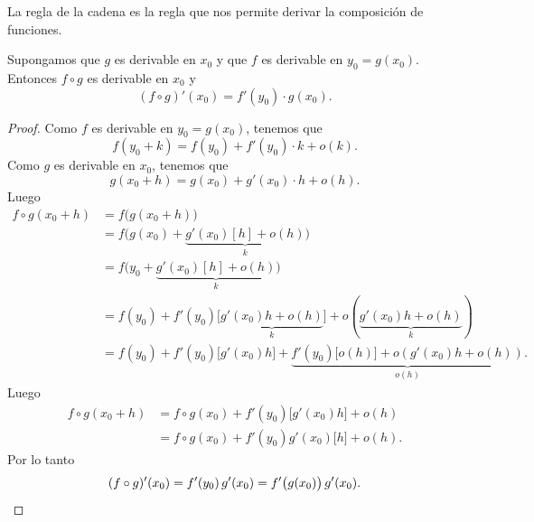 La regla de la cadena es la regla que nos permite derivar la composición de funciones.

\begin{proposition}
Supongamos que $g$ es derivable en $x_0$ y que $f$ es derivable en $y_0 = g(x_0)$.
Entonces $f\circ g$ es derivable en $x_0$ y
\[
(f\circ g)'(x_0) = f'(y_0) \cdot g(x_0).
\]
\end{proposition}

\begin{proof}
Como $f$ es derivable en $y_0 = g(x_0)$, tenemos que
\[
f(y_0+k) = f(y_0) + f'(y_0) \cdot k + o(k).
\]
Como $g$ es derivable en $x_0$, tenemos que 
\[
g(x_0+h) = g(x_0) + g'(x_0) \cdot h + o(h).
\]
Luego
\begin{align*}
    f\circ g(x_0+h) 
    &= f\big(g(x_0+h)\big) \\
    &= f\big(g(x_0)+\underbrace{g'(x_0)[h]+o(h)}_k \big) \\
    &= f\big(y_0 +\underbrace{g'(x_0)[h]+o(h)}_k \big) \\
    &= f(y_0) + f'(y_0) \big[\underbrace{g'(x_0)h+o(h)}_k\big] + o(\underbrace{g'(x_0)h+o(h)}_k)
    \\
    &= f(y_0) + f'(y_0) \big[g'(x_0)h\big] +
        \underbrace{f'(y_0)\big[o(h)\big] + o(g'(x_0)h+o(h))}_{o(h)}.
\end{align*}
Luego
\begin{align*}
    f\circ g(x_0+h) &= f\circ g(x_0) + f'(y_0) \big[g'(x_0)h\big] + o(h)\\
     &= f\circ g(x_0) + f'(y_0) g'(x_0) \big[h\big] + o(h).
\end{align*}
Por lo tanto
\[
(f\circ g)'(x_0) = f'(y_0)\, g'(x_0) = f'\big(g(x_0)\big) \, g'(x_0).
\qedhere
\]
\end{proof}


